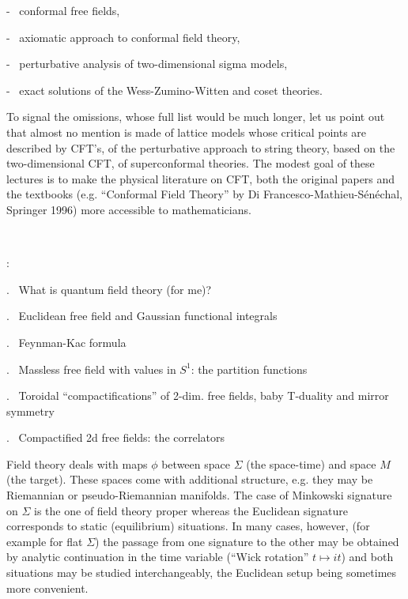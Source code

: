 \no- \ conformal free fields,
\vskip 0.3cm

\no- \ axiomatic approach to conformal field theory,
\vskip 0.3cm

\no- \ perturbative analysis of two-dimensional sigma models,
\vskip 0.3cm

\no- \ exact solutions of the Wess-Zumino-Witten and coset theories.
\vskip 0.35cm

\no To signal the omissions, whose full list
would be much longer, let us point out that almost no mention
is made of lattice models whose critical points are described
by CFT's, of the perturbative approach to string theory, based
on the two-dimensional CFT, of superconformal theories. The modest
goal of these lectures is to make the physical literature on CFT,
both the original papers and the textbooks
(e.g. ``Conformal Field Theory'' by Di Francesco-Mathieu-S\'{e}n\'{e}chal,
Springer 1996) more accessible to mathematicians.
\eject

\
\vskip 0.8cm

\vskip 0.8cm

\no{}:
\vskip 0.5cm

. \ What is quantum field theory (for me)?

. \ Euclidean free field and Gaussian functional integrals

. \ Feynman-Kac formula

. \ Massless free field with values in $S^1$: the partition
functions

. \ Toroidal ``compactifications'' of 2-dim.
free fields, baby T-duality and mirror symmetry

. \ Compactified 2d free fields: the correlators
\vskip 1.5cm


\vskip 0.4cm

\no Field theory deals with maps $\phi$
between space $\Sigma$ (the space-time) and space $M$ (the target).
These spaces come with additional structure, e.g. they may be
Riemannian or pseudo-Riemannian manifolds. The case of
Minkowski signature on $\Sigma$ is the one of field theory
proper whereas the Euclidean signature corresponds to
static (equilibrium) situations. In many cases, however,
(for example for flat $\Sigma$) the passage from one signature
to the other may be obtained by analytic continuation
in the time variable (``Wick rotation'' $t\mapsto it$)
and both situations may be studied interchangeably, the
Euclidean setup being sometimes more convenient.
\vskip 0.3cm

